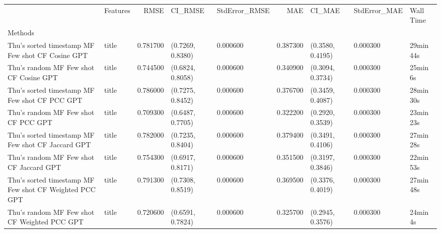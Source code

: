 \begin{tabular}{llrllrlll}
 & Features & RMSE & CI_RMSE & StdError_RMSE & MAE & CI_MAE & StdError_MAE & Wall Time \\
Methods &  &  &  &  &  &  &  &  \\
Thu's sorted timestamp MF Few shot CF Cosine GPT & title & 0.781700 & (0.7269, 0.8380) & 0.000600 & 0.387300 & (0.3580, 0.4195) & 0.000300 & 29min 44s \\
Thu's random MF Few shot CF Cosine GPT & title & 0.744500 & (0.6824, 0.8058) & 0.000600 & 0.340900 & (0.3094, 0.3734) & 0.000300 & 25min 6s \\
Thu's sorted timestamp MF Few shot CF PCC GPT & title & 0.786000 & (0.7275, 0.8452) & 0.000600 & 0.376700 & (0.3459, 0.4087) & 0.000300 & 28min 30s \\
Thu's random MF Few shot CF PCC GPT & title & 0.709300 & (0.6487, 0.7705) & 0.000600 & 0.322200 & (0.2920, 0.3539) & 0.000300 & 23min 23s \\
Thu's sorted timestamp MF Few shot CF Jaccard GPT & title & 0.782000 & (0.7235, 0.8404) & 0.000600 & 0.379400 & (0.3491, 0.4106) & 0.000300 & 27min 28s \\
Thu's random MF Few shot CF Jaccard GPT & title & 0.754300 & (0.6917, 0.8171) & 0.000600 & 0.351500 & (0.3197, 0.3846) & 0.000300 & 22min 53s \\
Thu's sorted timestamp MF Few shot CF Weighted PCC GPT & title & 0.791300 & (0.7308, 0.8519) & 0.000600 & 0.369500 & (0.3376, 0.4019) & 0.000300 & 27min 48s \\
Thu's random MF Few shot CF Weighted PCC GPT & title & 0.720600 & (0.6591, 0.7824) & 0.000600 & 0.325700 & (0.2945, 0.3576) & 0.000300 & 24min 4s \\
\end{tabular}
